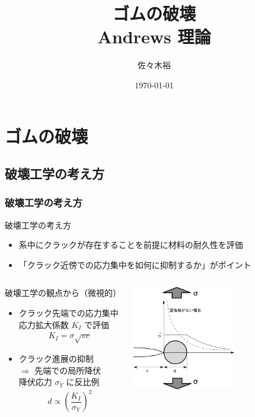 \documentclass[11pt, dvipdfmx]{beamer}
\title
{ゴムの破壊\\Andrews 理論}
\author{佐々木裕}
\institute[東亞合成]{東亞合成}
\date{\today}
\begin{document}
\begin{frame}\frametitle{}
	\titlepage
\end{frame}



\section{ゴムの破壊}


\subsection{破壊工学の考え方}

\begin{frame}
\frametitle{破壊工学の考え方}
\begin{exampleblock}{破壊工学の考え方}

\begin{itemize}
\item
系中にクラックが存在することを前提に材料の耐久性を評価
\item
\alert{「クラック近傍での応力集中を如何に抑制するか」}がポイント
\end{itemize}
\end{exampleblock}

\begin{columns}[totalwidth=1\textwidth]
\begin{alertblock}{破壊工学の観点から（微視的）}
	\begin{itemize}
		\item
		クラック先端での応力集中\\ \alert{応力拡大係数 $K_I$ で評価}
		\footnotesize
		\begin{align*}
		K_{I} = \sigma \sqrt{\pi c}
		\end{align*}
		\normalsize
		\item 
		クラック進展の抑制 \\
		$\Rightarrow$ 先端での\alert{局所降伏}\\
		降伏応力 $\sigma_Y$ に反比例
		\footnotesize
		\begin{align*}
		d \propto \left( \dfrac{K_I}{\sigma_Y} \right)^2
		\end{align*}
		\normalsize
	\end{itemize}
\end{alertblock}
	\centering
	\includegraphics[width=45mm]{fig/Crack_Yield.pdf}
\end{columns}

\end{frame}
\end{document}
